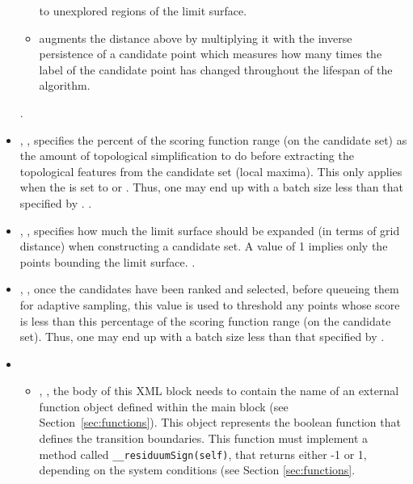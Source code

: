 \begin{itemize}
\begin{itemize}
       to unexplored regions of the limit surface.
       \item {} augments the distance above by
       multiplying it with the inverse persistence of a candidate point which
       measures how many times the label of the candidate point has changed
       throughout the lifespan of the algorithm.
    \end{itemize}
  .
  \item {}, , specifies the percent of the scoring function range (on the candidate
  set) as the amount of topological simplification to do before extracting the
  topological features from the candidate set (local maxima). This only applies
  when the  is set to  or
  . Thus, one may end up with a batch size less than that
  specified by .
  .
  \item {}, ,
  specifies how much the limit surface should be expanded (in terms of grid
  distance) when constructing a candidate set. A value of 1 implies only the
  points bounding the limit surface.
  .
  \item {}, ,
  once the candidates have been ranked and selected, before queueing them for
  adaptive sampling, this value is used to threshold any points whose score is
  less than this percentage of the scoring function range (on the candidate
  set). Thus, one may end up with a batch size less than that specified by
  .
  \item {}
    \begin{itemize}
      \item {}, ,  the
        body of this XML block needs to contain the name of an external
        function object defined within the  main block (see
        Section~\ref{sec:functions}).
        This object represents the boolean function that defines the transition
        boundaries.
        This function must implement a method called
        \texttt{\_\_residuumSign(self)}, that returns either -1 or 1, depending
        on the system conditions (see Section \ref{sec:functions}.

\end{itemize}
\end{itemize}
